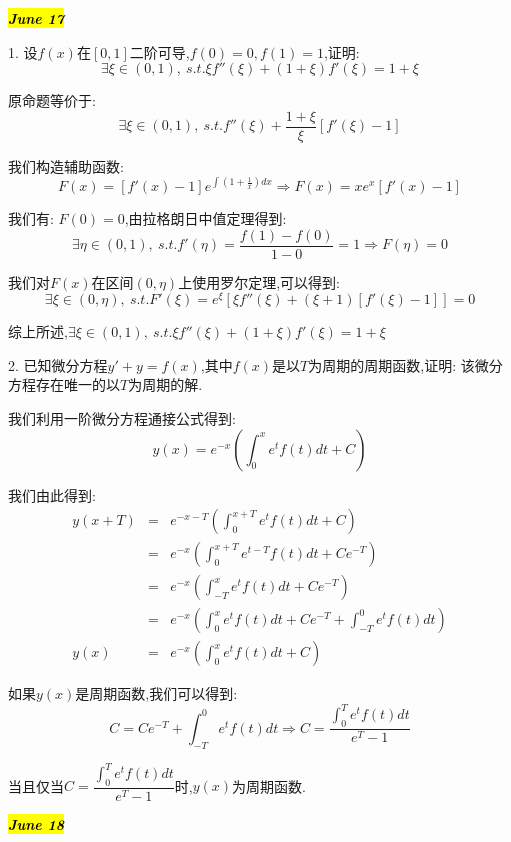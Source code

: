 \hl{\textbf{\textit{June 17}}}

1. 设$f(x)$在$[0,1]$二阶可导,$f(0)=0,f(1)=1$,证明: $$\exists \xi\in(0,1),\ s.t. \xi f''(\xi)+(1+\xi)f'(\xi)=1+\xi$$
\begin{solution}
	
	原命题等价于: 
	$$\exists \xi\in(0,1),\ s.t. f''(\xi)+\dfrac{1+\xi}{\xi}[f'(\xi)-1]$$
	
	我们构造辅助函数: 
	$$F(x)=[f'(x)-1]e^{\int(1+\frac{1}{x})dx}\Rightarrow F(x)=xe^x[f'(x)-1]$$
	
	我们有: $F(0)=0$,由拉格朗日中值定理得到: 
	$$\exists \eta\in(0,1),\ s.t. f'(\eta)=\dfrac{f(1)-f(0)}{1-0}=1\Rightarrow F(\eta)=0$$
	
	我们对$F(x)$在区间$(0,\eta)$上使用罗尔定理,可以得到: 
	$$\exists \xi\in(0,\eta),\ s.t. F'(\xi)=e^{\xi}[\xi f''(\xi)+(\xi+1)[f'(\xi)-1]]=0$$
	
	综上所述,$\exists \xi\in(0,1),\ s.t. \xi f''(\xi)+(1+\xi)f'(\xi)=1+\xi$
\end{solution}

2. 已知微分方程$y'+y=f(x)$,其中$f(x)$是以$T$为周期的周期函数,证明: 该微分方程存在唯一的以$T$为周期的解.
\begin{solution}
	
	我们利用一阶微分方程通接公式得到: 
	$$y(x)=e^{-x}(\int_{0}^{x}e^tf(t)dt+C)$$
	
	我们由此得到: 
	\begin{eqnarray*}
		y(x+T)&=&e^{-x-T}(\int_{0}^{x+T}e^tf(t)dt+C)\\
		&=&e^{-x}(\int_{0}^{x+T}e^{t-T}f(t)dt+Ce^{-T})\\
		&=&e^{-x}(\int_{-T}^{x}e^{t}f(t)dt+Ce^{-T})\\
		&=&e^{-x}(\int_{0}^{x}e^{t}f(t)dt+Ce^{-T}+\int_{-T}^{0}e^{t}f(t)dt)\\
		y(x)&=&e^{-x}(\int_{0}^{x}e^tf(t)dt+C)
	\end{eqnarray*}
	
	如果$y(x)$是周期函数,我们可以得到: 
	$$C=Ce^{-T}+\int_{-T}^{0}e^{t}f(t)dt\Rightarrow C=\dfrac{\int_{0}^{T}e^{t}f(t)dt}{e^{T}-1}$$
	
	当且仅当$C=\dfrac{\int_{0}^{T}e^{t}f(t)dt}{e^{T}-1}$时,$y(x)$为周期函数.
\end{solution}

\hl{\textbf{\textit{June 18}}}

